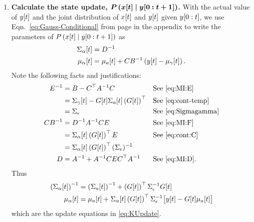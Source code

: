\begin{enumerate}
\item \label{PXupdate} \textbf{Calculate the state update,
    $\bm{P\left({x}{[t]}\mid y[0:t+1] \right)}$.}  With the
  actual value of ${y}{[t]}$ and the joint distribution of
  ${x}{[t]}$ and ${y}{[t]}$ given $y[0:t]$, we use
  Eqn.~\eqref{eq:Gauss-Conditional} from page
  \pageref{eq:Gauss-Conditional} in the appendix to write the
  parameters of $P\left({x}{[t]}\mid y[0:t+1] \right)$ as
  \begin{subequations}
    \label{eq:UpdateRaw}
    \begin{align}
      {\Sigma_\alpha}{[t]} &= D^{-1} \\
      {\mu_\alpha}{[t]} &= {\mu_a}{[t]} + CB^{-1} \left(
        {y}{[t]} - {\mu_\gamma}{[t]}\right).
    \end{align}
  \end{subequations}
  Note the following facts and justifications:
  \begin{align*}
    E^{-1} &= B - C^\top A^{-1}C && \text{See \eqref{eq:MI:E}}\\
    &= {\Sigma_\gamma}{[t]} - {G}{[t]}{\Sigma_a}{[t]} \left(
    {G}{[t]}\right)^\top && \text{See \eqref{eq:cont-temp}}\\
    &= \Sigma_\epsilon && \text{See \eqref{eq:Sigmagamma}}\\
    CB^{-1} &= D^{-1}A^{-1}CE && \text{See \eqref{eq:MI:F}} \\
    &= {\Sigma_\alpha}{[t]} \left( {G}{[t]}
    \right)^\top E && \text{See \eqref{eq:cont:C}}\\
    &= {\Sigma_\alpha}{[t]} \left( {G}{[t]}
    \right)^\top (\Sigma_\epsilon)^{-1}\\
    D &= A^{-1} + A^{-1} CEC^\top A^{-1} && \text{See \eqref{eq:MI:D}}.
  \end{align*}
  Thus
    \begin{align*}
      \left( {\Sigma_\alpha}{[t]} \right)^{-1} &= \left(
        {\Sigma_a}{[t]} \right)^{-1} + \left( {G}{[t]}
        \right)^\top \Sigma_\epsilon^{-1} {G}{[t]} \\
      {\mu_\alpha}{[t]} &= {\mu_a}{[t]} +
      {\Sigma_{\alpha}}{[t]} \left( {G}{[t]} \right)^\top
      \Sigma_\epsilon^{-1} \big[{y}{[t]} - {G}{[t]}
      {\mu_a}{[t]}\big]
    \end{align*}
  which are the update equations in \eqref{eq:KUpdate}.
\end{enumerate}

